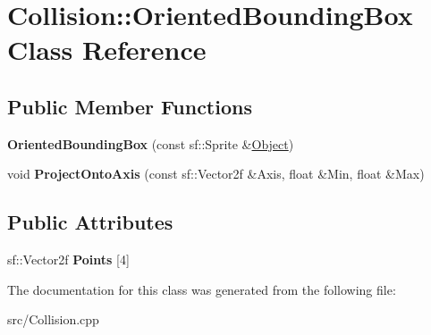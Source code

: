 \hypertarget{class_collision_1_1_oriented_bounding_box}{}\section{Collision\+::Oriented\+Bounding\+Box Class Reference}
\label{class_collision_1_1_oriented_bounding_box}
\subsection*{Public Member Functions}
\begin{DoxyCompactItemize}
\item 
\mbox{\label{class_collision_1_1_oriented_bounding_box_a26843fcb012e9443bf59b37b0c889f6d}} 
{\bfseries Oriented\+Bounding\+Box} (const sf\+::\+Sprite \&\mbox{\hyperlink{class_object}{Object}})
\item 
\mbox{\label{class_collision_1_1_oriented_bounding_box_af0764443fbcd83ed565f40feff5904b3}} 
void {\bfseries Project\+Onto\+Axis} (const sf\+::\+Vector2f \&Axis, float \&Min, float \&Max)
\end{DoxyCompactItemize}
\subsection*{Public Attributes}
\begin{DoxyCompactItemize}
\item 
\mbox{\label{class_collision_1_1_oriented_bounding_box_a7b780d99d599073a85ed2d56264b4775}} 
sf\+::\+Vector2f {\bfseries Points} \mbox{[}4\mbox{]}
\end{DoxyCompactItemize}


The documentation for this class was generated from the following file\+:\begin{DoxyCompactItemize}
\item 
src/Collision.\+cpp\end{DoxyCompactItemize}
